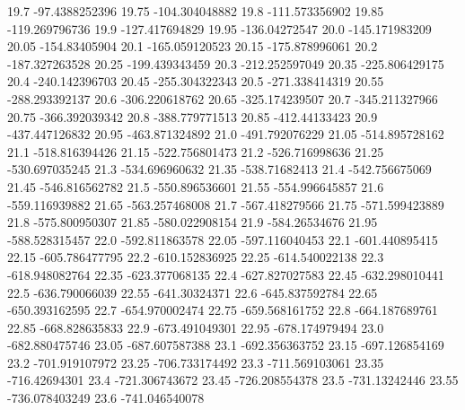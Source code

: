            19.7   -97.4388252396
          19.75   -104.304048882
           19.8   -111.573356902
          19.85   -119.269796736
           19.9   -127.417694829
          19.95    -136.04272547
           20.0   -145.171983209
          20.05    -154.83405904
           20.1   -165.059120523
          20.15   -175.878996061
           20.2   -187.327263528
          20.25   -199.439343459
           20.3   -212.252597049
          20.35   -225.806429175
           20.4   -240.142396703
          20.45   -255.304322343
           20.5   -271.338414319
          20.55   -288.293392137
           20.6   -306.220618762
          20.65   -325.174239507
           20.7   -345.211327966
          20.75   -366.392039342
           20.8   -388.779771513
          20.85    -412.44133423
           20.9   -437.447126832
          20.95   -463.871324892
           21.0   -491.792076229
          21.05   -514.895728162
           21.1   -518.816394426
          21.15   -522.756801473
           21.2   -526.716998636
          21.25   -530.697035245
           21.3   -534.696960632
          21.35    -538.71682413
           21.4   -542.756675069
          21.45   -546.816562782
           21.5   -550.896536601
          21.55   -554.996645857
           21.6   -559.116939882
          21.65   -563.257468008
           21.7   -567.418279566
          21.75   -571.599423889
           21.8   -575.800950307
          21.85   -580.022908154
           21.9    -584.26534676
          21.95   -588.528315457
           22.0   -592.811863578
          22.05   -597.116040453
           22.1   -601.440895415
          22.15   -605.786477795
           22.2   -610.152836925
          22.25   -614.540022138
           22.3   -618.948082764
          22.35   -623.377068135
           22.4   -627.827027583
          22.45   -632.298010441
           22.5   -636.790066039
          22.55    -641.30324371
           22.6   -645.837592784
          22.65   -650.393162595
           22.7   -654.970002474
          22.75   -659.568161752
           22.8   -664.187689761
          22.85   -668.828635833
           22.9   -673.491049301
          22.95   -678.174979494
           23.0   -682.880475746
          23.05   -687.607587388
           23.1   -692.356363752
          23.15   -697.126854169
           23.2   -701.919107972
          23.25   -706.733174492
           23.3   -711.569103061
          23.35    -716.42694301
           23.4   -721.306743672
          23.45   -726.208554378
           23.5    -731.13242446
          23.55   -736.078403249
           23.6   -741.046540078
